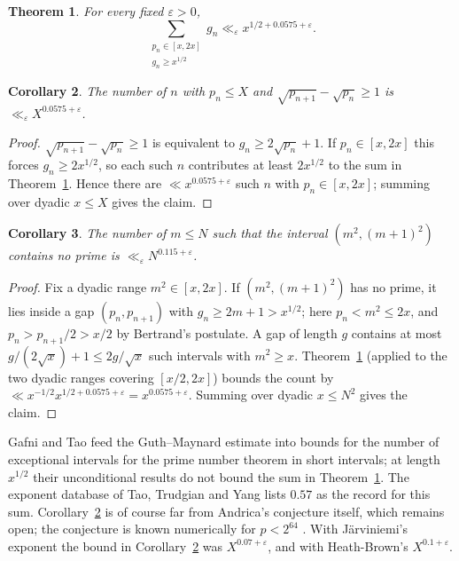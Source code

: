 \documentclass[11pt]{amsart}
\newtheorem{theorem}{Theorem}[section]
\newtheorem{corollary}[theorem]{Corollary}
\theoremstyle{definition}
\theoremstyle{remark}
\newcommand{\rz}{\RZERO}
\newcommand{\RZERO}{0.0575}
\begin{document}
\begin{theorem}\label{thm:main}
For every fixed $\varepsilon>0$,
\[
\sum_{\substack{p_n\in[x,2x]\\ g_n\ge x^{1/2}}} g_n\ll_\varepsilon x^{1/2+\rz+\varepsilon}.
\]
\end{theorem}

\begin{corollary}\label{cor:andrica}
The number of $n$ with $p_n\le X$ and $\sqrt{p_{n+1}}-\sqrt{p_n}\ge 1$ is $\ll_\varepsilon X^{\rz+\varepsilon}$.
\end{corollary}

\begin{proof}
$\sqrt{p_{n+1}}-\sqrt{p_n}\ge1$ is equivalent to $g_n\ge 2\sqrt{p_n}+1$. If $p_n\in[x,2x]$ this forces $g_n\ge 2x^{1/2}$, so each such $n$ contributes at least $2x^{1/2}$ to the sum in Theorem~\ref{thm:main}. Hence there are $\ll x^{\rz+\varepsilon}$ such $n$ with $p_n\in[x,2x]$; summing over dyadic $x\le X$ gives the claim.
\end{proof}

\begin{corollary}\label{cor:legendre}
The number of $m\le N$ such that the interval $(m^2,(m+1)^2)$ contains no prime is $\ll_\varepsilon N^{0.115+\varepsilon}$.
\end{corollary}

\begin{proof}
Fix a dyadic range $m^2\in[x,2x]$. If $(m^2,(m+1)^2)$ has no prime, it lies inside a gap $(p_n,p_{n+1})$ with $g_n\ge 2m+1>x^{1/2}$; here $p_n<m^2\le 2x$, and $p_n>p_{n+1}/2>x/2$ by Bertrand's postulate. A gap of length $g$ contains at most $g/(2\sqrt{x})+1\le 2g/\sqrt x$ such intervals with $m^2\ge x$. Theorem~\ref{thm:main} (applied to the two dyadic ranges covering $[x/2,2x]$) bounds the count by $\ll x^{-1/2}x^{1/2+\rz+\varepsilon}=x^{\rz+\varepsilon}$. Summing over dyadic $x\le N^2$ gives the claim.
\end{proof}

Gafni and Tao \cite{GT} feed the Guth--Maynard estimate into bounds for the number of exceptional intervals for the prime number theorem in short intervals; at length $x^{1/2}$ their unconditional results do not bound the sum in Theorem~\ref{thm:main}. The exponent database of Tao, Trudgian and Yang \cite{ANTEDB} lists $0.57$ as the record for this sum. Corollary~\ref{cor:andrica} is of course far from Andrica's conjecture itself, which remains open; the conjecture is known numerically for $p<2^{64}$ \cite{Visser}. With Järviniemi's exponent the bound in Corollary~\ref{cor:andrica} was $X^{0.07+\varepsilon}$, and with Heath-Brown's $X^{0.1+\varepsilon}$.
\end{document}
